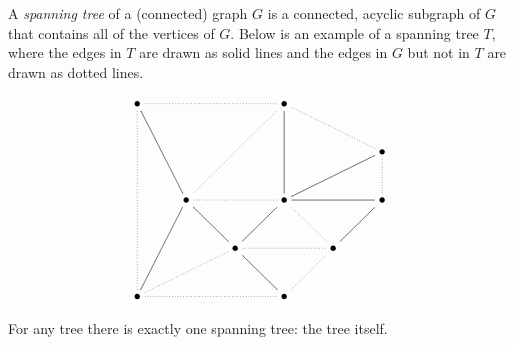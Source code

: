 \documentclass[12pt]{article}
\begin{document}
A \emph{spanning tree} of a (connected) graph $G$ is a connected, acyclic subgraph of $G$ that contains all of the vertices of $G$.  Below is an example of a spanning tree $T$, where the edges in $T$ are drawn as solid lines and the edges in $G$ but not in $T$ are drawn as dotted lines.

$$
\xymatrix{
\bullet \ar@{.}[dddd] \ar@{-}[ddr] \ar@{.}[rrr] &&& \bullet \ar@{.}[ddll] \ar@{-}[dd] \ar@{.}[drr] \\
&&&&&\bullet \ar@{-}[dll] \ar@{.}[d] \\
&\bullet\ar@{-}[ddl]\ar@{-}[dr]\ar@{.}[rr] && \bullet\ar@{-}[dl]\ar@{.}[dr]\ar@{-}[rr] &&\bullet\ar@{-}[dl] \\
&&\bullet\ar@{.}[dll]\ar@{-}[dr]\ar@{.}[rr]&&\bullet\ar@{.}[dl] \\
\bullet\ar@{.}[rrr]&&&\bullet
}
$$

For any tree there is exactly one spanning tree: the tree itself.
\end{document}
